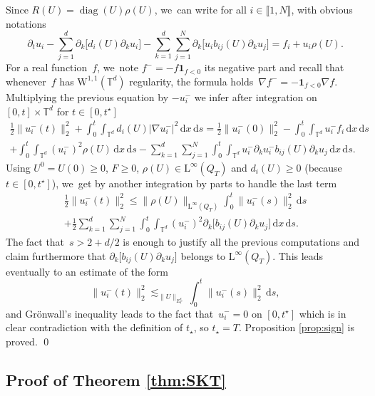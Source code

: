 \documentclass[JEP,XML,SOM,Unicode,published]{cedram}
\DeclareMathOperator{\diag}{diag}
\theoremstyle{definition}
\newcommand\T{\mathbb{T}}
\newcommand\dd{\mathrm{d}}
\renewcommand\L{\mathrm{L}}
\newcommand\W{\mathrm{W}}
\begin{document}
Since $R(U)= \diag(U)\rho(U)$, we~can write for all $i\in\llbracket 1,N\rrbracket$, with obvious notations\vspace*{-3pt}
\[
\partial_t u_i - \sum_{j=1}^d \partial_k \bigl[d_i(U)\partial_k u_i\bigr]-\sum_{k=1}^d \sum_{j=1}^N \partial_k \bigl[u_i b_{ij}(U) \partial_k u_j \bigr] = f_i + u_i \rho(U).
\]
For a real function~$f$, we~note $f^- = - f\mathbf{1}_{f<0}$ its negative part and recall that whenever~$f$ has $\W^{1,1}(\T^d)$ regularity, the formula holds~$\nabla f^- = -\mathbf{1}_{f<0} \nabla f$. Multiplying the previous equation by $-u_i^-$ we infer after integration on $[0,t]\times\T^d$ for $t\in[0,t^\star]$\vspace*{-7pt}
\begin{multline*}
\frac12 \|u_i^-(t)\|_2^2 + \int_0^t \int_{\T^d} d_i(U)|\nabla u_i^-|^2 \, \dd x\, \dd s= \frac12 \|u_i^-(0)\|_2^2 - \int_0^t \int_{\T^d} u_i^- f_i \, \dd x\, \dd s \\[-3pt]
+ \int_0^t \int_{\T^d} (u_i^-)^2 \rho(U) \, \dd x\, \dd s- \sum_{k=1}^d \sum_{j=1}^N \int_0^t \int_{\T^d} u_i^- \partial_k u_i^- b_{ij}(U) \partial_k u_j\, \dd x\, \dd s.
\end{multline*}
Using $U^0=U(0)\geq 0$, $F\geq0$, $\rho(U)\in\L^\infty(Q_{T})$ and $d_i(U)\geq 0$ (because $t\in[0,t^\star]$), we~get by another integration by parts to handle the last term\vspace*{-5pt}
\begin{multline*}
\frac12 \|u_i^-(t)\|_2^2 \leq \|\rho(U)\|_{\L^\infty(Q_T)} \int_0^t \|u_i^-(s)\|_2^2 \,\dd s \\[-8pt]
+ \frac12 \sum_{k=1}^d \sum_{j=1}^N \int_0^t \int_{\T^d} (u_i^-)^2 \partial_k\bigl[b_{ij}(U) \partial_k u_j\bigr]
\, \dd x\, \dd s.
\end{multline*}
The fact that~$s>2+d/2$ is enough to justify all the previous computations and claim furthermore that $\partial_k \bigl[b_{ij}(U)\partial_k u_j\bigr]$ belongs to $\L^\infty(Q_T)$. This leads eventually to an estimate of the form
\[
\|u_i^-(t)\|_2^2 \lesssim_{\|U\|_{E^s_T}} \int_0^t \|u_i^-(s)\|_2^2\,\dd s,
\]
and Grönwall's inequality leads to the fact that~$u_i^-=0$ on $[0,t^\star]$ which is in clear contradiction with the definition of $t_\star$, so $t_\star = T$. Proposition \ref{prop:sign} is proved. \qed

\subsection{Proof of Theorem \ref{thm:SKT}}
\end{document}
